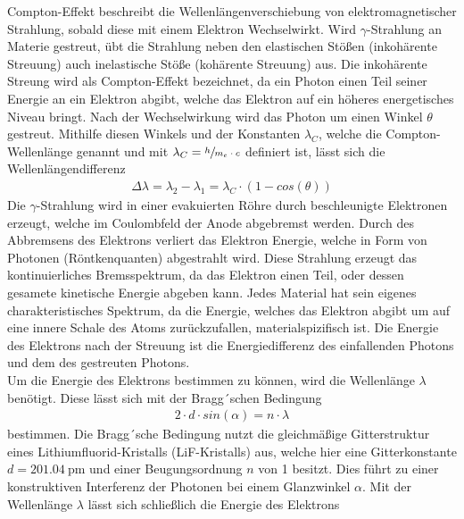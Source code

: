     \justifying Compton-Effekt beschreibt die Wellenlängenverschiebung von elektromagnetischer Strahlung, sobald diese mit einem Elektron Wechselwirkt. 
    Wird $\gamma$-Strahlung an Materie gestreut, übt die Strahlung neben den elastischen Stößen (inkohärente Streuung) auch inelastische Stöße (kohärente Streuung) aus. 
    Die inkohärente Streung wird als Compton-Effekt bezeichnet, da ein Photon einen Teil seiner Energie an ein Elektron abgibt, welche das Elektron auf ein 
    höheres energetisches Niveau bringt. Nach der Wechselwirkung wird das Photon um einen Winkel $\theta$ gestreut. Mithilfe diesen Winkels und der Konstanten
    $\lambda_C$, welche die Compton-Wellenlänge genannt und mit $\lambda_C = \sfrac{h}{m_e \cdot c}$ definiert ist, lässt sich die Wellenlängendifferenz \cite{V603}
    \begin{align}
        \Delta \lambda = \lambda_2 - \lambda_1 = \lambda_C \cdot (1-cos(\theta)) \label{eq:1}
    \end{align}
    \justifying Die $\gamma$-Strahlung wird in einer evakuierten Röhre durch beschleunigte Elektronen erzeugt, welche im Coulombfeld der Anode
    abgebremst werden. Durch des Abbremsens des Elektrons verliert das Elektron Energie, welche in Form von Photonen (Röntkenquanten) abgestrahlt wird. Diese Strahlung
    erzeugt das kontinuierliches Bremsspektrum, da das Elektron einen Teil, oder dessen gesamete kinetische Energie abgeben kann. Jedes Material hat sein eigenes charakteristisches 
    Spektrum, da die Energie, welches das Elektron abgibt um auf eine innere Schale des 
    Atoms zurückzufallen, materialspizifisch ist. Die Energie des Elektrons nach der Streuung ist die Energiedifferenz des einfallenden Photons und dem des gestreuten 
    Photons.\\
    Um die Energie des Elektrons bestimmen zu können, wird die Wellenlänge $\lambda$ benötigt. Diese lässt sich mit der Bragg´schen Bedingung \cite{V603}
    \begin{align}
        2 \cdot d \cdot sin(\alpha) = n \cdot \lambda \label{eq:2}
    \end{align}
    bestimmen. Die Bragg´sche Bedingung nutzt die gleichmäßige Gitterstruktur eines Lithiumfluorid-Kristalls (LiF-Kristalls) aus, welche hier eine Gitterkonstante $d = \SI{201.04}
    {\pico\meter}$ und einer Beugungsordnung $n$ von 1 besitzt. Dies führt zu einer konstruktiven Interferenz der Photonen bei einem Glanzwinkel $\alpha$. Mit der Wellenlänge
    $\lambda$ lässt sich schließlich die Energie des Elektrons
